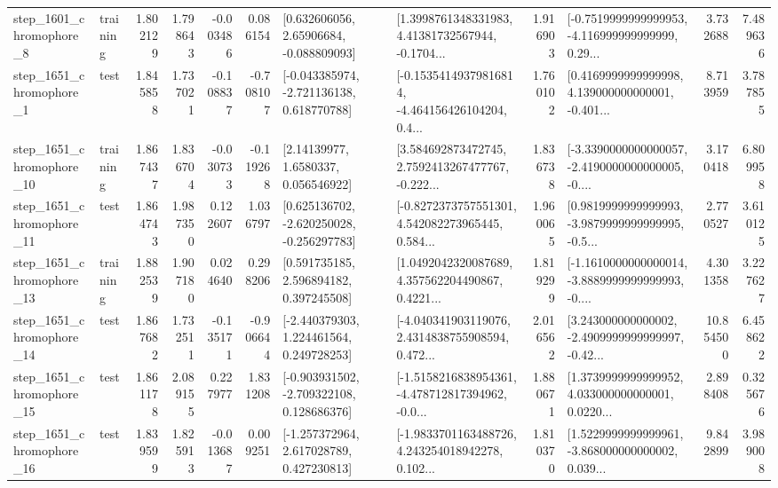 \begin{tabular}{llrrrrllrlrr}
  step\_1601\_chromophore\_8 &  training &      1.802129 &    1.798643 &     -0.003486 &  0.086154 &     [0.632606056, 2.65906684, -0.088809093] &  [1.3998761348331983, 4.41381732567944, -0.1704... &       1.916903 &  [-0.7519999999999953, -4.116999999999999, 0.29... &            3.732688 &          7.489636 \\
  step\_1651\_chromophore\_1 &      test &      1.845858 &    1.737021 &     -0.108837 & -0.708107 &   [-0.043385974, -2.721136138, 0.618770788] &  [-0.15354149379816814, -4.464156426104204, 0.4... &       1.760102 &  [0.4169999999999998, 4.139000000000001, -0.401... &            8.713959 &          3.787855 \\
 step\_1651\_chromophore\_10 &  training &      1.867437 &    1.836704 &     -0.030733 & -0.119268 &        [2.14139977, 1.6580337, 0.056546922] &  [3.584692873472745, 2.7592413267477767, -0.222... &       1.836738 &  [-3.3390000000000057, -2.4190000000000005, -0.... &            3.170418 &          6.809958 \\
 step\_1651\_chromophore\_11 &      test &      1.864743 &    1.987350 &      0.122607 &  1.036797 &   [0.625136702, -2.620250028, -0.256297783] &  [-0.8272373757551301, 4.542082273965445, 0.584... &       1.960065 &  [0.9819999999999993, -3.9879999999999995, -0.5... &            2.770527 &          3.610125 \\
 step\_1651\_chromophore\_13 &  training &      1.882539 &    1.907180 &      0.024640 &  0.298206 &     [0.591735185, 2.596894182, 0.397245508] &  [1.0492042320087689, 4.357562204490867, 0.4221... &       1.819299 &  [-1.1610000000000014, -3.8889999999999993, -0.... &            4.301358 &          3.227627 \\
 step\_1651\_chromophore\_14 &      test &      1.867682 &    1.732511 &     -0.135171 & -0.906644 &    [-2.440379303, 1.224461564, 0.249728253] &  [-4.040341903119076, 2.4314838755908594, 0.472... &       2.016562 &  [3.243000000000002, -2.4909999999999997, -0.42... &           10.854500 &          6.458622 \\
 step\_1651\_chromophore\_15 &      test &      1.861178 &    2.089155 &      0.227977 &  1.831208 &   [-0.903931502, -2.709322108, 0.128686376] &  [-1.5158216838954361, -4.478712817394962, -0.0... &       1.880671 &  [1.3739999999999952, 4.033000000000001, 0.0220... &            2.898408 &          0.325676 \\
 step\_1651\_chromophore\_16 &      test &      1.839599 &    1.825913 &     -0.013687 &  0.009251 &    [-1.257372964, 2.617028789, 0.427230813] &  [-1.9833701163488726, 4.243254018942278, 0.102... &       1.810370 &  [1.5229999999999961, -3.868000000000002, 0.039... &            9.842899 &          3.989008 \\

\end{tabular}
